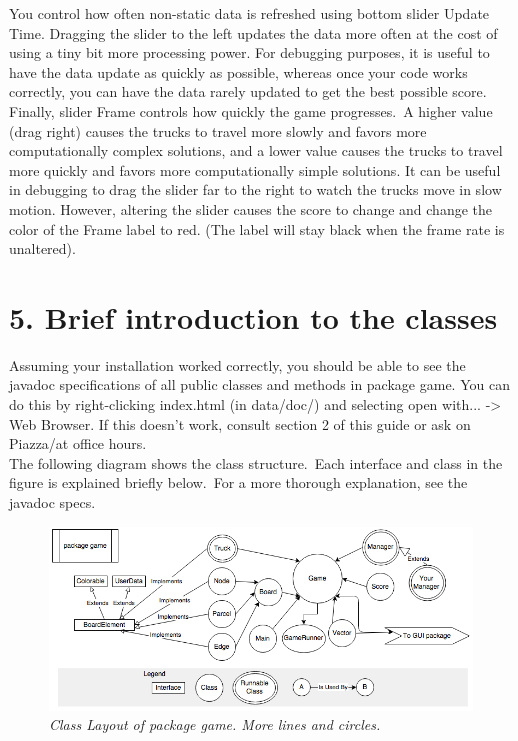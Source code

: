 \documentclass[11pt]{article}
\begin{document}
You control how often non-static data is refreshed using bottom slider Update Time. Dragging the slider to the left updates the data more often at the cost of using a tiny bit more processing 
power. For debugging purposes, it is useful to have the data update as quickly as possible, whereas once your code works correctly, you can have the data rarely updated to get the best possible score.\\

Finally, slider Frame controls how quickly the game progresses.\ A higher value (drag right) causes the trucks to travel more slowly and favors more computationally complex solutions, and a lower value causes the trucks to travel more quickly and favors more computationally simple solutions. It can be useful in debugging to drag the slider far to the right to watch the trucks move in slow motion. However, altering the slider causes the score to change and change the color of the Frame label to red. (The label will stay black when the frame rate is unaltered).\\

\section{5. Brief introduction to the classes}
Assuming your installation worked correctly, you should be able to see the javadoc specifications of all public classes and methods in package game. You can do this by right-clicking index.html (in data/doc/) and selecting open with... -> Web Browser. If this doesn't work, consult section 2 of this guide or ask on Piazza/at office hours.\\

The following diagram shows the class structure.\ Each interface and class in the figure is explained briefly below.\ For a more thorough explanation, see the javadoc specs.
\begin{figure}[h]
\centerline{\includegraphics[scale=0.7]{hirearchy.png}} 
\caption{\em{Class Layout of package game. More lines and circles.}}
\end{figure}
\end{document}
